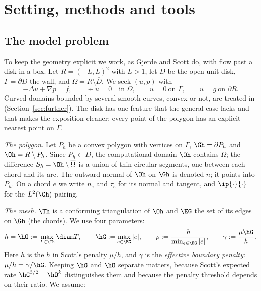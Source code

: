 \section{Setting, methods and tools}\label{sec:setting}

\subsection{The model problem}
To keep the geometry explicit we work, as Gjerde and Scott do, with flow past a disk in a box. Let $R=(-L,L)^2$ with $L>1$, let $D$ be the open unit disk, $\Gamma=\partial D$ the wall, and $\Omega=R\setminus\overline D$. We seek $(u,p)$ with
\[
-\Delta u+\nabla p=f,\qquad \div u=0\quad\text{in }\Omega,\qquad u=0\ \text{on }\Gamma,\qquad u=g\ \text{on }\partial R .
\]
Curved domains bounded by several smooth curves, convex or not, are treated in \cite{PadhiExt} (Section~\ref{sec:further}). The disk has one feature that the general case lacks and that makes the exposition cleaner: every point of the polygon has an explicit nearest point on $\Gamma$.

\emph{The polygon.} Let $P_h$ be a convex polygon with vertices on $\Gamma$, $\Gh=\partial P_h$ and $\Oh=R\setminus P_h$. Since $P_h\subset D$, the computational domain $\Oh$ contains $\Omega$; the difference $S_h=\Oh\setminus\overline\Omega$ is a union of thin circular segments, one between each chord and its arc. The outward normal of $\Oh$ on $\Gh$ is denoted $n$; it points into $P_h$. On a chord $e$ we write $n_e$ and $\tau_e$ for its normal and tangent, and $\ip{\cdot}{\cdot}$ for the $L^2(\Gh)$ pairing.

\emph{The mesh.} $\Th$ is a conforming triangulation of $\Oh$ and $\EG$ the set of its edges on $\Gh$ (the chords). We use four parameters:
\[
h=\hO:=\max_{T\in\Th}\diam T,\qquad
\hG:=\max_{e\in\EG}|e|,\qquad
\rho:=\frac{h}{\min_{e\in\EG}|e|},\qquad
\gamma:=\frac{\mu\hG}{h}.
\]
Here $h$ is the $h$ in Scott's penalty $\mu/h$, and $\gamma$ is the \emph{effective boundary penalty}: $\mu/h=\gamma/\hG$. Keeping $\hG$ and $\hO$ separate matters, because Scott's expected rate $\hG^{3/2}+\hO^k$ distinguishes them and because the penalty threshold depends on their ratio. We assume:

